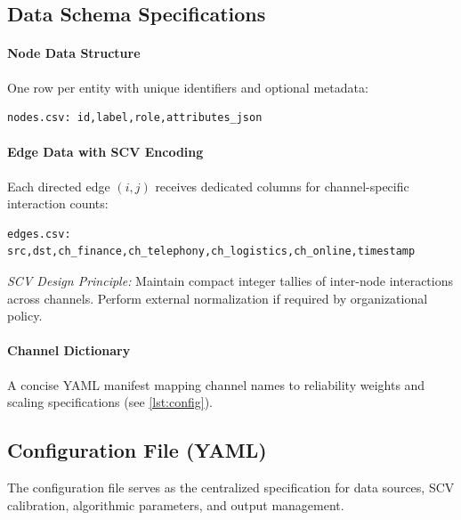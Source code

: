 \documentclass[12pt]{article}
\theoremstyle{plain}
\begin{document}
\subsection{Data Schema Specifications}
\paragraph{Node Data Structure}
One row per entity with unique identifiers and optional metadata:
\begin{verbatim}
nodes.csv: id,label,role,attributes_json
\end{verbatim}

\paragraph{Edge Data with SCV Encoding}
Each directed edge $(i,j)$ receives dedicated columns for channel-specific interaction counts:
\begin{verbatim}
edges.csv: src,dst,ch_finance,ch_telephony,ch_logistics,ch_online,timestamp
\end{verbatim}

\emph{SCV Design Principle:} Maintain compact integer tallies of inter-node interactions across channels. Perform external normalization if required by organizational policy.

\paragraph{Channel Dictionary}
A concise YAML manifest mapping channel names to reliability weights and scaling specifications (see \autoref{lst:config}).

\subsection{Configuration File (YAML)}
\noindent The configuration file serves as the centralized specification for data sources, SCV calibration, algorithmic parameters, and output management.
\end{document}
